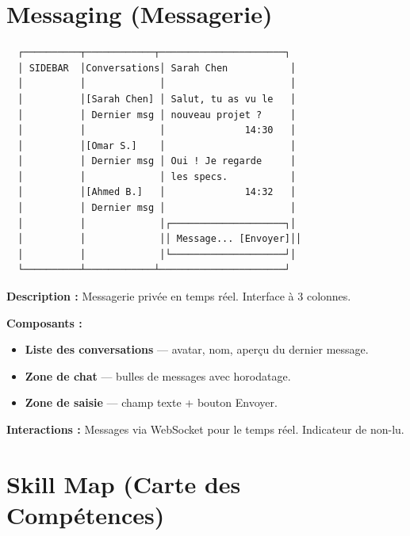\documentclass[12pt,a4paper]{article}
\begin{document}
\section{Messaging (Messagerie)}

\begin{verbatim}
  ┌──────────┬────────────┬──────────────────────┐
  │ SIDEBAR  │Conversations│ Sarah Chen           │
  │          │             │                      │
  │          │[Sarah Chen] │ Salut, tu as vu le   │
  │          │ Dernier msg │ nouveau projet ?     │
  │          │             │              14:30   │
  │          │[Omar S.]    │                      │
  │          │ Dernier msg │ Oui ! Je regarde     │
  │          │             │ les specs.           │
  │          │[Ahmed B.]   │              14:32   │
  │          │ Dernier msg │                      │
  │          │             │┌────────────────────┐│
  │          │             ││ Message... [Envoyer]││
  │          │             │└────────────────────┘│
  └──────────┴────────────┴──────────────────────┘
\end{verbatim}

\textbf{Description :} Messagerie privée en temps réel. Interface à 3 colonnes.

\textbf{Composants :}
\begin{itemize}
    \item \textbf{Liste des conversations} — avatar, nom, aperçu du dernier message.
    \item \textbf{Zone de chat} — bulles de messages avec horodatage.
    \item \textbf{Zone de saisie} — champ texte + bouton Envoyer.
\end{itemize}

\textbf{Interactions :} Messages via WebSocket pour le temps réel. Indicateur de non-lu.

\section{Skill Map (Carte des Compétences)}
\end{document}
